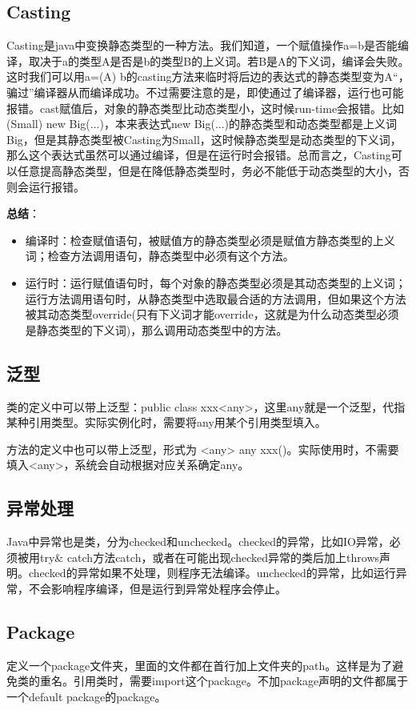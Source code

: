 \documentclass{article}
\begin{document}
	\subsection{Casting}
	Casting是java中变换静态类型的一种方法。我们知道，一个赋值操作a=b是否能编译，取决于a的类型A是否是b的类型B的上义词。若B是A的下义词，编译会失败。这时我们可以用a=(A) b的casting方法来临时将后边的表达式的静态类型变为A“，骗过”编译器从而编译成功。不过需要注意的是，即使通过了编译器，运行也可能报错。cast赋值后，对象的静态类型比动态类型小，这时候run-time会报错。比如(Small) new Big(...)，本来表达式new Big(...)的静态类型和动态类型都是上义词Big，但是其静态类型被Casting为Small，这时候静态类型是动态类型的下义词，那么这个表达式虽然可以通过编译，但是在运行时会报错。总而言之，Casting可以任意提高静态类型，但是在降低静态类型时，务必不能低于动态类型的大小，否则会运行报错。
	
	{\bfseries 总结}：
	\begin{itemize}
		\item 编译时：检查赋值语句，被赋值方的静态类型必须是赋值方静态类型的上义词；检查方法调用语句，静态类型中必须有这个方法。
		\item 运行时：运行赋值语句时，每个对象的静态类型必须是其动态类型的上义词；运行方法调用语句时，从静态类型中选取最合适的方法调用，但如果这个方法被其动态类型override(只有下义词才能override，这就是为什么动态类型必须是静态类型的下义词)，那么调用动态类型中的方法。
	\end{itemize}
	\subsection{泛型}
	类的定义中可以带上泛型：public class xxx<any>，这里any就是一个泛型，代指某种引用类型。实际实例化时，需要将any用某个引用类型填入。
	
	方法的定义中也可以带上泛型，形式为 <any> any xxx()。实际使用时，不需要填入<any>，系统会自动根据对应关系确定any。
	
	\subsection{异常处理}
	Java中异常也是类，分为checked和unchecked。checked的异常，比如IO异常，必须被用try\& catch方法catch，或者在可能出现checked异常的类后加上throws声明。checked的异常如果不处理，则程序无法编译。unchecked的异常，比如运行异常，不会影响程序编译，但是运行到异常处程序会停止。
	
	\subsection{Package}
	定义一个package文件夹，里面的文件都在首行加上文件夹的path。这样是为了避免类的重名。引用类时，需要import这个package。不加package声明的文件都属于一个default package的package。
	
\end{document}
